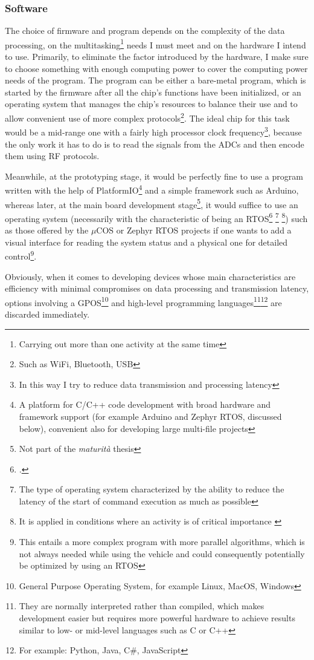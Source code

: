 \documentclass[a4paper, 10pt, final]{article} %
\newcommand{\parenciteit}[2]{\textit{\parencite[#1]{#2}}} %
\begin{document}
    \subsubsection{Software}\label{sec:MotherboardDesignSoftware}
    The choice of firmware and program depends on the complexity of the data processing, on the multitasking\footnote{Carrying out more than one activity at the same time} needs I must meet and on the hardware I intend to use.
    Primarily, to eliminate the factor introduced by the hardware, I make sure to choose something with enough computing power to cover the computing power needs of the program.
    The program can be either a bare-metal program, which is started by the firmware after all the chip's functions have been initialized, or an operating system that manages the chip's resources to balance their use and to allow convenient use of more complex protocols\footnote{Such as WiFi, Bluetooth, USB}.
    The ideal chip for this task would be a mid-range one with a fairly high processor clock frequency\footnote{In this way I try to reduce data transmission and processing latency}, because the only work it has to do is to read the signals from the ADCs and then encode them using RF protocols.

    Meanwhile, at the prototyping stage, it would be perfectly fine to use a program written with the help of PlatformIO\footnote{A platform for C/C++ code development with broad hardware and framework support (for example Arduino and Zephyr RTOS, discussed below), convenient also for developing large multi-file projects} and a simple framework such as Arduino, whereas later, at the main board development stage\footnote{Not part of the \emph{maturit\`{a}} thesis}, it would suffice to use an operating system (necessarily with the characteristic of being an RTOS\footcite[]{RTOS:Wiki} \footnote{The type of operating system characterized by the ability to reduce the latency of the start of command execution as much as possible} \footnote{It is applied in conditions where an activity is of critical importance \parenciteit{}{MissionCritical:Wiki}}) such as those offered by the $\mu$COS or Zephyr RTOS projects
    if one wants to add a visual interface for reading the system status and a physical one for detailed control\footnote{This entails a more complex program with more parallel algorithms, which is not always needed while using the vehicle and could consequently potentially be optimized by using an RTOS}.

    Obviously, when it comes to developing devices whose main characteristics are efficiency with minimal compromises on data processing and transmission latency, options involving a GPOS\footnote{General Purpose Operating System, for example Linux, MacOS, Windows} and high-level programming languages\footnote{They are normally interpreted rather than compiled, which makes development easier but requires more powerful hardware to achieve results similar to low- or mid-level languages such as C or C++}\:\footnote{For example: Python, Java, C\#, JavaScript} are discarded immediately.
    
\end{document}
